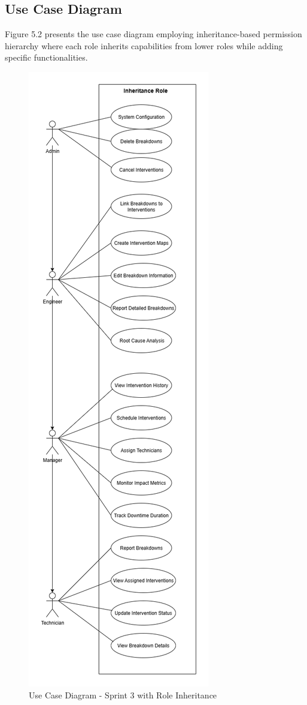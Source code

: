 \subsection{Use Case Diagram}

Figure 5.2 presents the use case diagram employing inheritance-based permission hierarchy where each role inherits capabilities from lower roles while adding specific functionalities.

\begin{figure}[H]
    \centering
    \includegraphics[width=0.3\linewidth]{img/chap_05/sprint3_usecase_diagram.png}
    \caption{Use Case Diagram - Sprint 3 with Role Inheritance}
    \label{fig:use_case_diagram_sprint3}
\end{figure}

